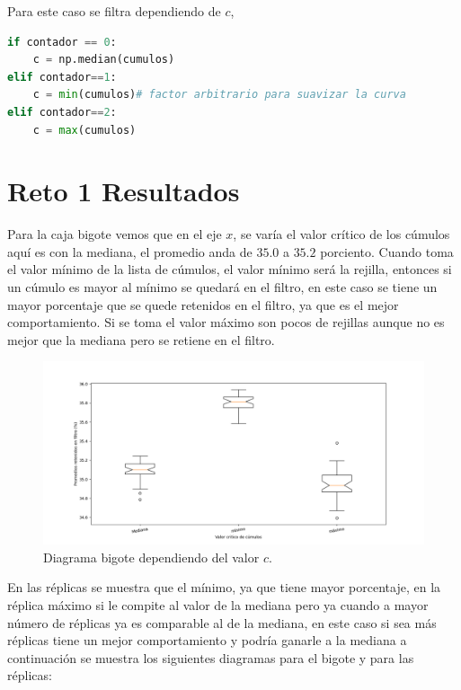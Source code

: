 \documentclass{article}
\begin{document}
Para este caso se filtra dependiendo de $c$,
\begin{lstlisting}[caption=Valor filtrado dependiendo de $c$, language=Python]
if contador == 0:
    c = np.median(cumulos)           
elif contador==1:
    c = min(cumulos)# factor arbitrario para suavizar la curva
elif contador==2:
    c = max(cumulos)
\end{lstlisting}


\section{Reto 1 Resultados}\label{}
Para la caja bigote vemos que en el eje $x$, se varía el valor crítico de los cúmulos aquí es con la mediana, el promedio anda de $35.0$ a $35.2$ porciento. Cuando toma el valor mínimo de la lista de cúmulos, el valor mínimo será la rejilla, entonces si un cúmulo es mayor al mínimo se quedará en el filtro, en este caso se tiene un mayor porcentaje que se quede retenidos en el filtro, ya que es el mejor comportamiento. Si se toma el valor máximo son pocos de rejillas aunque no es mejor que la mediana pero se retiene en el filtro.

\begin{figure}
    \centering
    \includegraphics[width=210mm]{R1_box.png}
    \caption{Diagrama bigote dependiendo del valor $c$.}
    \label{figure}
\end{figure}

En las réplicas se muestra que el mínimo, ya que tiene mayor porcentaje, en la réplica máximo si le compite al valor de la mediana pero ya cuando a mayor número de réplicas ya es comparable al de la mediana, en este caso si sea más réplicas tiene un mejor comportamiento y podría ganarle a la mediana a continuación se muestra los siguientes diagramas para el bigote y para las réplicas:
\end{document}
